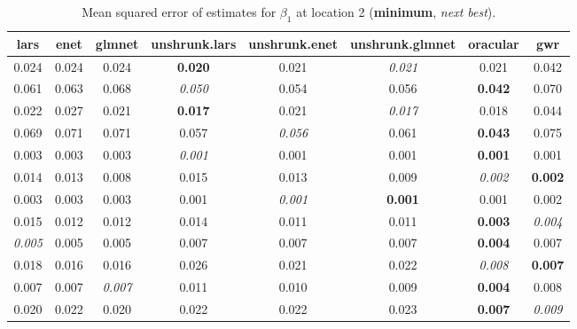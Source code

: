 \documentclass[authoryear, review, 11pt]{elsarticle}
\begin{document}
		\begin{table}[ht]
		\begin{center}
		\begin{tabular}{cccccccc}
		 lars & enet & glmnet & unshrunk.lars & unshrunk.enet & unshrunk.glmnet & oracular & gwr \\ 
		  \hline
		0.024 & 0.024 & 0.024 & \textbf{0.020} & 0.021 & \emph{0.021} & 0.021 & 0.042 \\ 
		  0.061 & 0.063 & 0.068 & \emph{0.050} & 0.054 & 0.056 & \textbf{0.042} & 0.070 \\ 
		  0.022 & 0.027 & 0.021 & \textbf{0.017} & 0.021 & \emph{0.017} & 0.018 & 0.044 \\ 
		  0.069 & 0.071 & 0.071 & 0.057 & \emph{0.056} & 0.061 & \textbf{0.043} & 0.075 \\ 
		  0.003 & 0.003 & 0.003 & \emph{0.001} & 0.001 & 0.001 & \textbf{0.001} & 0.001 \\ 
		  0.014 & 0.013 & 0.008 & 0.015 & 0.013 & 0.009 & \emph{0.002} & \textbf{0.002} \\ 
		  0.003 & 0.003 & 0.003 & 0.001 & \emph{0.001} & \textbf{0.001} & 0.001 & 0.002 \\ 
		  0.015 & 0.012 & 0.012 & 0.014 & 0.011 & 0.011 & \textbf{0.003} & \emph{0.004} \\ 
		  \emph{0.005} & 0.005 & 0.005 & 0.007 & 0.007 & 0.007 & \textbf{0.004} & 0.007 \\ 
		  0.018 & 0.016 & 0.016 & 0.026 & 0.021 & 0.022 & \emph{0.008} & \textbf{0.007} \\ 
		  0.007 & 0.007 & \emph{0.007} & 0.011 & 0.010 & 0.009 & \textbf{0.004} & 0.008 \\ 
		  0.020 & 0.022 & 0.020 & 0.022 & 0.022 & 0.023 & \textbf{0.007} & \emph{0.009} \\ 
		  \end{tabular}
		\caption{Mean squared error of estimates for $\beta_1$ at location 2 (\textbf{minimum}, \emph{next best}).\label{loc2-X1-MSEX}}
		\end{center}
		\end{table}
		
\end{document}
